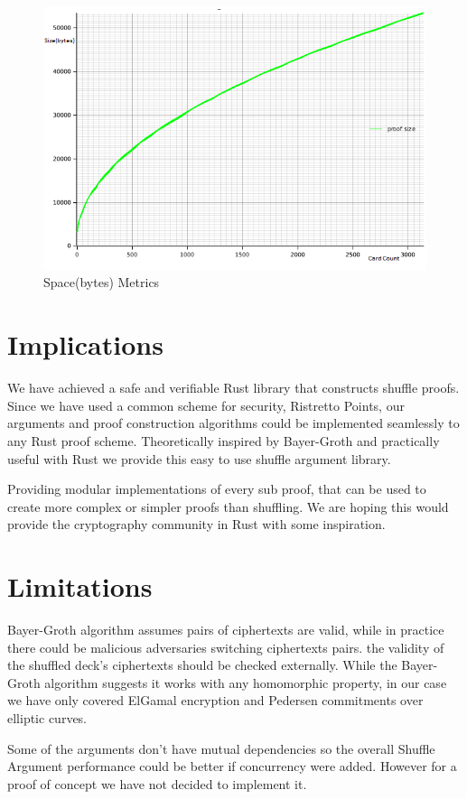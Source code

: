\documentclass[12pt,a4paper]{report}
\begin{document}
\begin{figure}[h]
	\includegraphics[scale=0.8]{space}
	\caption{Space(bytes) Metrics}
	\label{fig:space}
\end{figure}
\section{Implications}
We have achieved a safe and verifiable Rust library that constructs shuffle proofs.
Since we have used a common scheme for security, Ristretto Points, our arguments and proof construction algorithms could be implemented seamlessly to any Rust proof scheme.
Theoretically inspired by Bayer-Groth and practically useful with Rust we provide this easy to use shuffle argument library.\par
Providing modular implementations of every sub proof, that can be used to create more complex or simpler proofs than shuffling.
We are hoping this would provide the cryptography community in Rust with some inspiration.
\section{Limitations}
Bayer-Groth algorithm assumes pairs of ciphertexts are valid, while in practice there could be malicious adversaries switching ciphertexts pairs. the validity of the shuffled deck's ciphertexts should be checked externally.
While the Bayer-Groth algorithm suggests it works with any homomorphic property,
in our case we have only covered ElGamal encryption and Pedersen commitments over elliptic curves.\par
Some of the arguments don't have mutual dependencies so the overall Shuffle Argument performance
could be better if concurrency were added. However for a proof of concept we have not decided to implement it.
\end{document}
